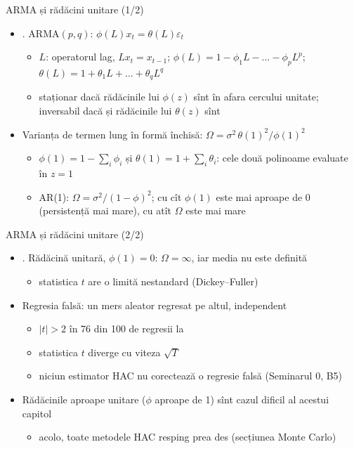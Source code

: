 \begin{frame}{ARMA și rădăcini unitare (1/2)}
\itemsize{\small}
\begin{itemize}
    \item {}. ARMA$(p,q)$: $\phi(L)x_t = \theta(L)\varepsilon_t$
    \begin{itemize}
        \item $L$: operatorul lag, $Lx_t = x_{t-1}$; $\phi(L) = 1 - \phi_1L - \dots - \phi_pL^p$; $\theta(L) = 1 + \theta_1L + \dots + \theta_qL^q$
        \item staționar dacă rădăcinile lui $\phi(z)$ sînt în afara cercului unitate; inversabil dacă și rădăcinile lui $\theta(z)$ sînt
    \end{itemize}
    \item Varianța de termen lung în formă închisă: $\Omega = \sigma^2\,\theta(1)^2/\phi(1)^2$
    \begin{itemize}
        \item $\phi(1) = 1 - \sum_i\phi_i$ și $\theta(1) = 1 + \sum_i\theta_i$: cele două polinoame evaluate în $z = 1$
        \item AR(1): $\Omega = \sigma^2/(1-\phi)^2$; cu cît $\phi(1)$ este mai aproape de 0 (persistență mai mare), cu atît $\Omega$ este mai mare
    \end{itemize}
\end{itemize}
\end{frame}

\begin{frame}{ARMA și rădăcini unitare (2/2)}
\itemsize{\small}
\begin{itemize}
    \item {}. Rădăcină unitară, $\phi(1) = 0$: $\Omega = \infty$, iar media nu este definită
    \begin{itemize}
        \item statistica $t$ are o limită nestandard (Dickey--Fuller)
    \end{itemize}
    \item Regresia falsă: un mers aleator regresat pe altul, independent
    \begin{itemize}
        \item $|t| > 2$ în 76 din 100 de regresii la 
        \item statistica $t$ diverge cu viteza $\sqrt{T}$ 
        \item niciun estimator HAC nu corectează o regresie falsă (Seminarul 0, B5)
    \end{itemize}
    \item Rădăcinile aproape unitare ($\phi$ aproape de 1) sînt cazul dificil al acestui capitol
    \begin{itemize}
        \item acolo, toate metodele HAC resping prea des (secțiunea Monte Carlo)
    \end{itemize}
\end{itemize}
\end{frame}

